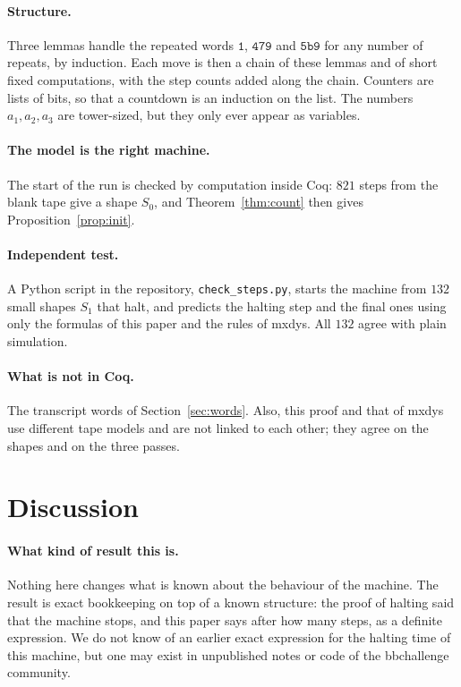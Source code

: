 \documentclass[11pt]{article}
\theoremstyle{remark}
\newcommand{\w}[1]{\mathtt{#1}}
\begin{document}
\paragraph{Structure.} Three lemmas handle the repeated words $\w1$, $\w{479}$
and $\w{5b9}$ for any number of repeats, by induction. Each move is then a
chain of these lemmas and of short fixed computations, with the step counts
added along the chain. Counters are lists of bits, so that a countdown is an
induction on the list. The numbers $a_1,a_2,a_3$ are tower-sized, but they only
ever appear as variables.

\paragraph{The model is the right machine.} The start of the run is checked by
computation inside Coq: $821$ steps from the blank tape give a shape $S_0$, and
Theorem~\ref{thm:count} then gives Proposition~\ref{prop:init}.

\paragraph{Independent test.} A Python script in the repository,
\texttt{check\_steps.py}, starts the machine from $132$ small shapes $S_1$ that
halt, and predicts the halting step and the final ones using only the formulas
of this paper and the rules of mxdys. All $132$ agree with plain simulation.

\paragraph{What is not in Coq.} The transcript words of
Section~\ref{sec:words}. Also, this proof and that of mxdys use different tape
models and are not linked to each other; they agree on the shapes and on the
three passes.

\section{Discussion}

\paragraph{What kind of result this is.} Nothing here changes what is known
about the behaviour of the machine. The result is exact bookkeeping on top of a
known structure: the proof of halting said that the machine stops, and this
paper says after how many steps, as a definite expression. We do not know of an
earlier exact expression for the halting time of this machine, but one may
exist in unpublished notes or code of the bbchallenge community.
\end{document}
